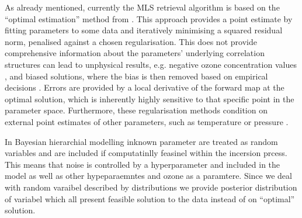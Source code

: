 As already mentioned, currently the MLS retrieval algorithm \cite{livesey2006retrieval} is based on the ``optimal estimation'' method from \cite{rodgers1976retrieval}.
This approach provides a point estimate by fitting parameters to some data and iteratively minimising a squared residual norm, penalised against a chosen regularisation.
This does not provide comprehensive information about the parameters' underlying correlation structures can lead to unphysical results, e.g. negative ozone concentration values \cite{MLSdata}, and biased solutions, where the bias is then removed based on empirical decisions \cite{livesey2008ozonecarbonmono, Froidevaux2008snrozone}.
Errors are provided by a local derivative of the forward map at the optimal solution, which is inherently highly sensitive to that specific point in the parameter space.
Furthermore, these regularisation methods condition on external point estimates of other parameters, such as temperature or pressure \cite{livesey2006retrieval}.

In Bayesian hierarchial modelling inknown parameter are treated as random variables and are included if computatinlly feasinel within the incersion prcess.
This means that noise is controlled by a hyperparameter and included in the model as well as other hypeparaemntes and ozone as a paramtere.
Since we deal with random varaibel described by distributions we provide posterior distribution of variabel which all present feasible solution to the data instead of on ``optimal'' solution.

